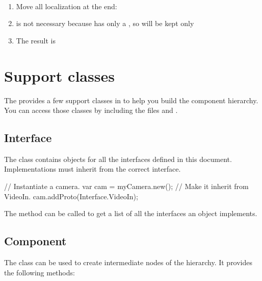\begin{example}~\\
  \begin{enumerate}
  \item Move all localization at the end:
  \item {} is not necessary because  has only a
    , so  will be kept only
  \item The result is 
  \end{enumerate}
\end{example}

\section{Support classes}
The \usdk provides a few support classes in \us to help you build the component
hierarchy. You can access those classes by including the files
 and .

\subsection{Interface}

The  class contains \us objects for all the interfaces defined
in this document. Implementations must inherit from the correct interface.

\begin{urbiunchecked}
// Instantiate a camera.
var cam = myCamera.new();
// Make it inherit from VideoIn.
cam.addProto(Interface.VideoIn);
\end{urbiunchecked}

The  method can be called to get a list of all
the interfaces an object implements.

\subsection{Component}

The  class can be used to create intermediate nodes of the
hierarchy. It provides the following methods:

